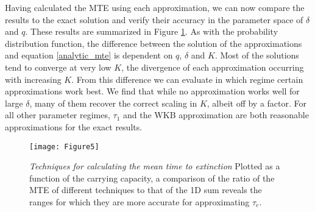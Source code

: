 Having calculated the MTE using each approximation, we can now compare the results to the exact solution and verify their accuracy in the parameter space of $\delta$ and $q$.
These results are summarized in Figure \ref{mte_techn}.
As with the probability distribution function, the difference between the solution of the approximations and equation \ref{analytic_mte} is dependent on $q$, $\delta$ and $K$.
Most of the solutions tend to converge at very low $K$, the divergence of each approximation occurring with increasing $K$.
From this difference we can evaluate in which regime certain approximations work best.
We find that while no approximation works well for large $\delta$, many of them recover the correct scaling in $K$, albeit off by a factor. %
For all other parameter regimes, $\tau_1$ and the WKB approximation are both reasonable approximations for the exact results. %

\begin{figure}[ht!]
\centering
\texttt{[image: Figure5]}
\caption{\emph{Techniques for calculating the mean time to extinction} Plotted as a function of the carrying capacity, a comparison of the ratio of the MTE of different techniques to that of the 1D sum reveals the ranges for which they are more accurate for approximating $\tau_{e}$.} \label{mte_techn}
\end{figure}
